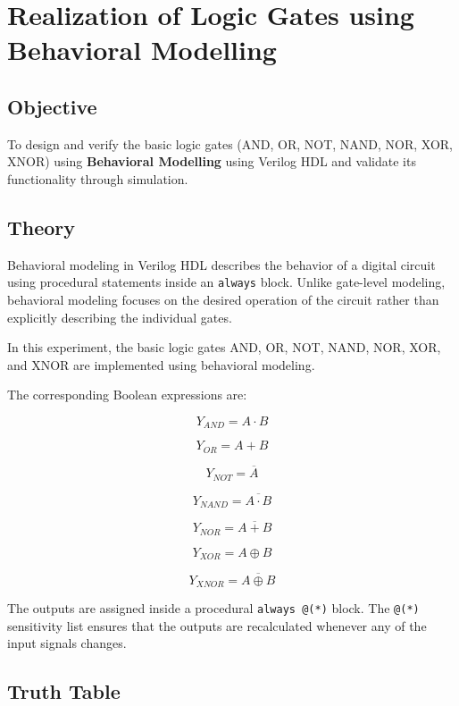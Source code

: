 \documentclass[12pt,a4paper]{report}
\begin{document}
\chapter{Realization of Logic Gates using Behavioral Modelling}
\label{ch:pdf8}

\section{Objective}

To design and verify the basic logic gates (AND, OR, NOT, NAND, NOR, XOR, XNOR) using \textbf{Behavioral Modelling} using Verilog HDL and validate its functionality through simulation.

\section{Theory}

Behavioral modeling in Verilog HDL describes the behavior of a digital circuit using procedural statements inside an \texttt{always} block. Unlike gate-level modeling, behavioral modeling focuses on the desired operation of the circuit rather than explicitly describing the individual gates.

In this experiment, the basic logic gates AND, OR, NOT, NAND, NOR, XOR, and XNOR are implemented using behavioral modeling.

The corresponding Boolean expressions are:

\[
Y_{AND} = A \cdot B
\]

\[
Y_{OR} = A + B
\]

\[
Y_{NOT} = \overline{A}
\]

\[
Y_{NAND} = \overline{A \cdot B}
\]

\[
Y_{NOR} = \overline{A + B}
\]

\[
Y_{XOR} = A \oplus B
\]

\[
Y_{XNOR} = \overline{A \oplus B}
\]

The outputs are assigned inside a procedural \texttt{always @(*)} block. The \texttt{@(*)} sensitivity list ensures that the outputs are recalculated whenever any of the input signals changes.

\section{Truth Table}
\end{document}
